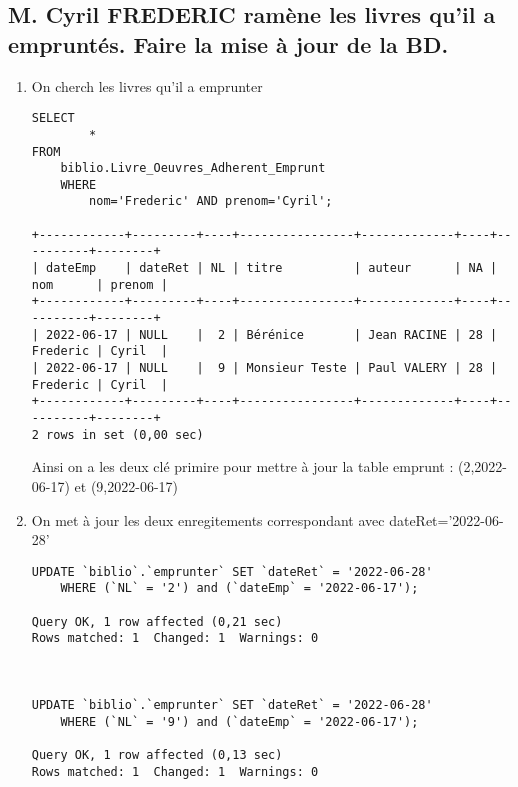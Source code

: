 \documentclass[11]{article}
\begin{document}
\subsection{ M. Cyril FREDERIC ramène les livres qu’il a empruntés. Faire la mise à jour de
	la BD.}
\begin{enumerate}
	\item On cherch les livres qu'il a emprunter
	      \begin{verbatim}
SELECT 
		*
FROM
	biblio.Livre_Oeuvres_Adherent_Emprunt
	WHERE 
		nom='Frederic' AND prenom='Cyril';

+------------+---------+----+----------------+-------------+----+----------+--------+
| dateEmp    | dateRet | NL | titre          | auteur      | NA | nom      | prenom |
+------------+---------+----+----------------+-------------+----+----------+--------+
| 2022-06-17 | NULL    |  2 | Bérénice       | Jean RACINE | 28 | Frederic | Cyril  |
| 2022-06-17 | NULL    |  9 | Monsieur Teste | Paul VALERY | 28 | Frederic | Cyril  |
+------------+---------+----+----------------+-------------+----+----------+--------+
2 rows in set (0,00 sec)
		\end{verbatim}
	      Ainsi on a les deux clé primire pour mettre à jour la table emprunt : (2,2022-06-17) et (9,2022-06-17)

	\item  On met à jour les deux enregitements correspondant avec dateRet='2022-06-28'
	      \begin{verbatim}
UPDATE `biblio`.`emprunter` SET `dateRet` = '2022-06-28' 
	WHERE (`NL` = '2') and (`dateEmp` = '2022-06-17');

Query OK, 1 row affected (0,21 sec)
Rows matched: 1  Changed: 1  Warnings: 0

			

UPDATE `biblio`.`emprunter` SET `dateRet` = '2022-06-28' 
	WHERE (`NL` = '9') and (`dateEmp` = '2022-06-17');

Query OK, 1 row affected (0,13 sec)
Rows matched: 1  Changed: 1  Warnings: 0
\end{verbatim}
\end{enumerate}
\end{document}
